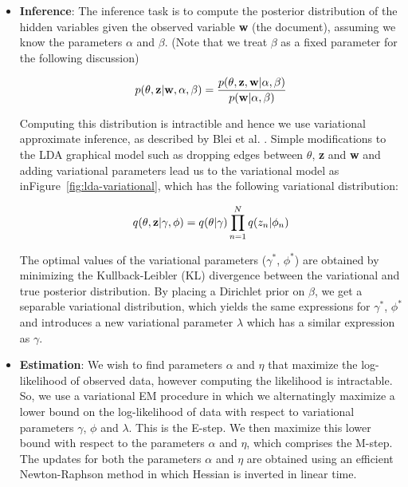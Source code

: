 \documentclass{article} %
\begin{document}
\begin{itemize}[leftmargin=*]

\item[] {\bf Inference}: The inference task is to compute the posterior 
distribution of the hidden variables given the observed variable {\bf w} (the 
document), assuming we know the parameters $\alpha$ and $\beta$. (Note that 
we treat $\beta$ as a fixed parameter for the following discussion)

\begin{equation} \label{eq2}
p(\theta,{\bf z} | {\bf w},\alpha,\beta ) = \frac{p(\theta,{\bf z}, {\bf w}|\alpha,\beta)}{p({\bf w}|\alpha,\beta)} 
\end{equation}

Computing this distribution is intractible and hence we use variational 
approximate inference, as described by Blei et al. \cite{lda}. Simple 
modifications to the LDA graphical model such as dropping edges between 
$\theta$, {\bf z} and 
{\bf w} and adding variational parameters lead us to the variational model as inFigure~\ref{fig:lda-variational}, which has the following variational distribution:
 
\begin{equation} \label{eq3}
q(\theta,{\bf z}|\gamma, \phi) = q(\theta|\gamma)\prod_{n=1}^{N}q(z_{n}|\phi_{n})
\end{equation}

The optimal values of the variational parameters ($\gamma^{*}$, $\phi^{*}$) are 
obtained by minimizing the
Kullback-Leibler (KL) divergence between the variational and true posterior
distribution. By placing a Dirichlet prior on $\beta$, we get a separable 
variational distribution, which yields the same expressions for $\gamma^{*}$, 
$\phi^{*}$ and introduces a new variational parameter $\lambda$ which has a 
similar expression as $\gamma$.

\item[] {\bf Estimation}: We wish to find parameters $\alpha$ and $\eta$ that
maximize the log-likelihood of observed data, however computing the likelihood
is intractable. So, we use a variational EM procedure in which we alternatingly
maximize a lower bound on the log-likelihood of data with respect to 
variational parameters $\gamma$, $\phi$ and $\lambda$. This is the E-step. We 
then maximize this lower bound with respect to the parameters $\alpha$ and 
$\eta$, which comprises the M-step. The updates for both the parameters $\alpha$
and $\eta$ are obtained using an efficient Newton-Raphson method in which 
Hessian is inverted in linear time.

\end{itemize}
\end{document}
